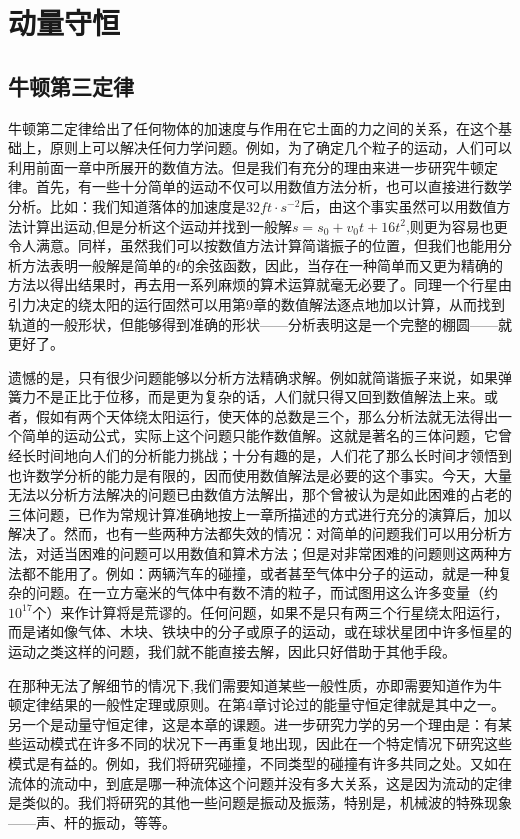 \chapter{动量守恒}

\section{牛顿第三定律}

牛顿第二定律给出了任何物体的加速度与作用在它土面的力之间的关系，在这个基础上，原则上可以解决任何力学问题。例如，为了确定几个粒子的运动，人们可以利用前面一章中所展开的数值方法。但是我们有充分的理由来进一步研究牛顿定律。首先，有一些十分简单的运动不仅可以用数值方法分析，也可以直接进行数学分析。比如：我们知道落体的加速度是$32ft \cdot s^{-2}$后，由这个事实虽然可以用数值方法计算出运动,但是分析这个运动并找到一般解$s=s_0+v_0t+16t^2$,则更为容易也更令人满意。同样，虽然我们可以按数值方法计算简谐振子的位置，但我们也能用分析方法表明一般解是简单的$t$的余弦函数，因此，当存在一种简单而又更为精确的方法以得出结果时，再去用一系列麻烦的算术运算就毫无必要了。同理一个行星由引力决定的绕太阳的运行固然可以用第9章的数值解法逐点地加以计算，从而找到轨道的一般形状，但能够得到准确的形状——分析表明这是一个完整的棚圆——就更好了。

遗憾的是，只有很少问题能够以分析方法精确求解。例如就简谐振子来说，如果弹簧力不是正比于位移，而是更为复杂的话，人们就只得又回到数值解法上来。或者，假如有两个天体绕太阳运行，使天体的总数是三个，那么分析法就无法得出一个简单的运动公式，实际上这个问题只能作数值解。这就是著名的三体问题，它曾经长时间地向人们的分析能力挑战；十分有趣的是，人们花了那么长时间才领悟到也许数学分析的能力是有限的，因而使用数值解法是必要的这个事实。今天，大量无法以分析方法解决的问题已由数值方法解出，那个曾被认为是如此困难的占老的三体问题，已作为常规计算准确地按上一章所描述的方式进行充分的演算后，加以解决了。然而，也有一些两种方法都失效的情况：对简单的问题我们可以用分析方法，对适当困难的问题可以用数值和算术方法；但是对非常困难的问题则这两种方法都不能用了。例如：两辆汽车的碰撞，或者甚至气体中分子的运动，就是一种复杂的问题。在一立方毫米的气体中有数不清的粒子，而试图用这么许多变量（约$10^{17}$个）来作计算将是荒谬的。任何问题，如果不是只有两三个行星绕太阳运行，而是诸如像气体、木块、铁块中的分子或原子的运动，或在球状星团中许多恒星的运动之类这样的问题，我们就不能直接去解，因此只好借助于其他手段。

在那种无法了解细节的情况下,我们需要知道某些一般性质，亦即需要知道作为牛顿定律结果的一般性定理或原则。在第4章讨论过的能量守恒定律就是其中之一。另一个是动量守恒定律，这是本章的课题。进一步研究力学的另一个理由是：有某些运动模式在许多不同的状况下一再重复地出现，因此在一个特定情况下研究这些模式是有益的。例如，我们将研究碰撞，不同类型的碰撞有许多共同之处。又如在流体的流动中，到底是哪一种流体这个问题并没有多大关系，这是因为流动的定律是类似的。我们将研究的其他一些问题是振动及振荡，特别是，机械波的特殊现象——声、杆的振动，等等。

